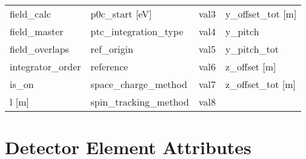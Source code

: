 \begin{tabular}{llll}
field_calc                     & p0c_start [eV]                 & val3                           & y_offset_tot [m]               \\
field_master                   & ptc_integration_type           & val4                           & y_pitch                        \\
field_overlaps                 & ref_origin                     & val5                           & y_pitch_tot                    \\
integrator_order               & reference                      & val6                           & z_offset [m]                   \\
is_on                          & space_charge_method            & val7                           & z_offset_tot [m]               \\
l [m]                          & spin_tracking_method           & val8                           &                                \\
 \bottomrule
 \end{tabular}
 \vfill
 
 \section{Detector Element Attributes}
 \label{s:list.detector}
 
